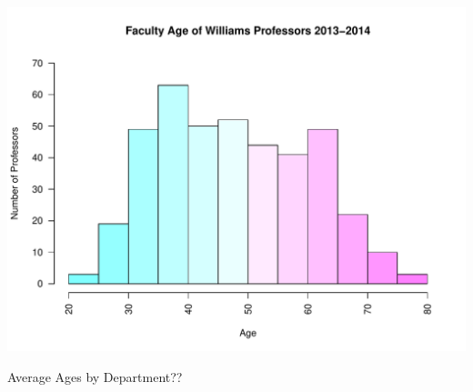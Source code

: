 \documentclass[12pt,a4paper]{article}\usepackage[]{graphicx}\usepackage[]{color}
\makeatletter
\def\maxwidth{ %
  \ifdim\Gin@nat@width>\linewidth
    \linewidth
  \else
    \Gin@nat@width
  \fi
}
\newenvironment{knitrout}{}{} %
\theoremstyle{definition}
\makeatother
\begin{document}
\begin{knitrout}
\includegraphics[width=\maxwidth]{figure/unnamed-chunk-9-10} 

\end{knitrout}


Average Ages by Department??
\end{document}
